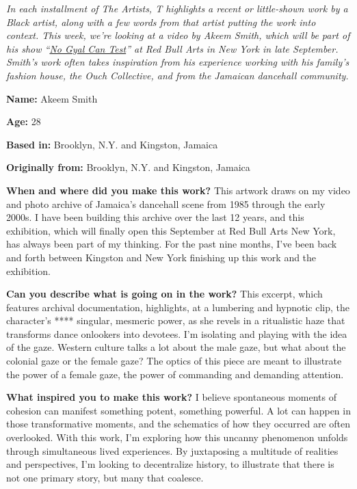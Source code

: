 \emph{In each installment of The Artists, T highlights a recent or
little-shown work by a Black artist, along with a few words from that
artist putting the work into context. This week, we're looking at a
video by Akeem Smith, which will be part of his show
``}\href{https://redbullarts.com/newyork/news/akeem-smith-no-gyal-can-test/}{\emph{No
Gyal Can Test}}\emph{'' at Red Bull Arts in New York in late September.
Smith's work often takes inspiration from his experience working with
his family's fashion house, the Ouch Collective, and from the Jamaican
dancehall community.}

\textbf{Name:} Akeem Smith

\textbf{Age:} 28

\textbf{Based in:} Brooklyn, N.Y. and Kingston, Jamaica

\textbf{Originally from:} Brooklyn, N.Y. and Kingston, Jamaica

\textbf{When and where did you make this work?} This artwork draws on my
video and photo archive of Jamaica's dancehall scene from 1985 through
the early 2000s. I have been building this archive over the last 12
years, and this exhibition, which will finally open this September at
Red Bull Arts New York, has always been part of my thinking. For the
past nine months, I've been back and forth between Kingston and New York
finishing up this work and the exhibition.

\textbf{Can you describe what is going on in the work?} This excerpt,
which features archival documentation, highlights, at a lumbering and
hypnotic clip, the character's **** singular, mesmeric power, as she
revels in a ritualistic haze that transforms dance onlookers into
devotees. I'm isolating and playing with the idea of the gaze. Western
culture talks a lot about the male gaze, but what about the colonial
gaze or the female gaze? The optics of this piece are meant to
illustrate the power of a female gaze, the power of commanding and
demanding attention.

\textbf{What inspired you to make this work?} I believe spontaneous
moments of cohesion can manifest something potent, something powerful. A
lot can happen in those transformative moments, and the schematics of
how they occurred are often overlooked. With this work, I'm exploring
how this uncanny phenomenon unfolds through simultaneous lived
experiences. By juxtaposing a multitude of realities and perspectives,
I'm looking to decentralize history, to illustrate that there is not one
primary story, but many that coalesce.

